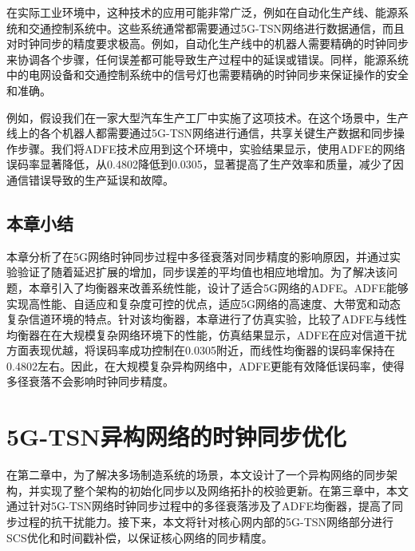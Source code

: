 \documentclass[UTF8,a4paper,12pt]{ctexart}
\numberwithin{equation}{section}
\begin{document}
	在实际工业环境中，这种技术的应用可能非常广泛，例如在自动化生产线、能源系统和交通控制系统中。这些系统通常都需要通过5G-TSN网络进行数据通信，而且对时钟同步的精度要求极高。例如，自动化生产线中的机器人需要精确的时钟同步来协调各个步骤，任何误差都可能导致生产过程中的延误或错误。同样，能源系统中的电网设备和交通控制系统中的信号灯也需要精确的时钟同步来保证操作的安全和准确。
	
	例如，假设我们在一家大型汽车生产工厂中实施了这项技术。在这个场景中，生产线上的各个机器人都需要通过5G-TSN网络进行通信，共享关键生产数据和同步操作步骤。我们将ADFE技术应用到这个环境中，实验结果显示，使用ADFE的网络误码率显著降低，从0.4802降低到0.0305，显著提高了生产效率和质量，减少了因通信错误导致的生产延误和故障。
	
	
	\subsection{本章小结}
	本章分析了在5G网络时钟同步过程中多径衰落对同步精度的影响原因，并通过实验验证了随着延迟扩展的增加，同步误差的平均值也相应地增加。为了解决该问题，本章引入了均衡器来改善系统性能，设计了适合5G网络的ADFE。ADFE能够实现高性能、自适应和复杂度可控的优点，适应5G网络的高速度、大带宽和动态复杂信道环境的特点。针对该均衡器，本章进行了仿真实验，比较了ADFE与线性均衡器在在大规模复杂网络环境下的性能，仿真结果显示，ADFE在应对信道干扰方面表现优越，将误码率成功控制在0.0305附近，而线性均衡器的误码率保持在0.4802左右。因此，在大规模复杂异构网络中，ADFE更能有效降低误码率，使得多径衰落不会影响时钟同步精度。
	\newpage
	\section{5G-TSN异构网络的时钟同步优化}
	在第二章中，为了解决多场制造系统的场景，本文设计了一个异构网络的同步架构，并实现了整个架构的初始化同步以及网络拓扑的校验更新。在第三章中，本文通过针对5G-TSN网络时钟同步过程中的多径衰落涉及了ADFE均衡器，提高了同步过程的抗干扰能力。接下来，本文将针对核心网内部的5G-TSN网络部分进行SCS优化和时间戳补偿，以保证核心网络的同步精度。
	
\end{document}
